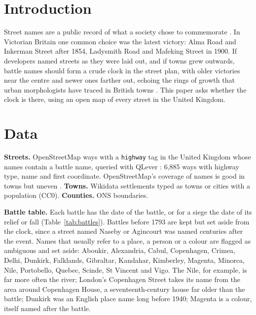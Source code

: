 \documentclass[11pt,a4paper]{article}
\begin{document}
\section{Introduction}
Street names are a public record of what a society chose to commemorate \citep{azaryahu1996,alderman2000,roseredwood2010}. In Victorian Britain one common choice was the latest victory: Alma Road and Inkerman Street after 1854, Ladysmith Road and Mafeking Street in 1900. If developers named streets as they were laid out, and if towns grew outwards, battle names should form a crude clock in the street plan, with older victories near the centre and newer ones farther out, echoing the rings of growth that urban morphologists have traced in British towns \citep{conzen1960,whitehand1972}. This paper asks whether the clock is there, using an open map of every street in the United Kingdom.

\section{Data}
\textbf{Streets.} OpenStreetMap ways with a \texttt{highway} tag in the United Kingdom whose names contain a battle name, queried with QLever \citep{bast2017}: 6,885 ways with highway type, name and first coordinate. OpenStreetMap's coverage of names is good in towns but uneven \citep{haklay2010}. \textbf{Towns.} Wikidata settlements typed as towns or cities with a population (CC0). \textbf{Counties.} ONS boundaries.

\textbf{Battle table.} Each battle has the date of the battle, or for a siege the date of its relief or fall (Table~\ref{tab:battles}). Battles before 1793 are kept but set aside from the clock, since a street named Naseby or Agincourt was named centuries after the event. Names that usually refer to a place, a person or a colour are flagged as ambiguous and set aside: Aboukir, Alexandria, Cabul, Copenhagen, Crimea, Delhi, Dunkirk, Falklands, Gibraltar, Kandahar, Kimberley, Magenta, Minorca, Nile, Portobello, Quebec, Scinde, St Vincent and Vigo. The Nile, for example, is far more often the river; London's Copenhagen Street takes its name from the area around Copenhagen House, a seventeenth-century house far older than the battle; Dunkirk was an English place name long before 1940; Magenta is a colour, itself named after the battle.
\end{document}
